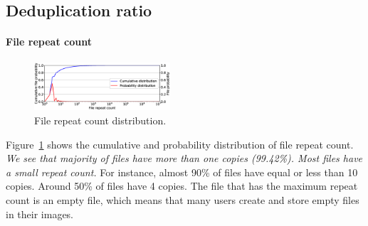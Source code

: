 \subsection{Deduplication ratio}
\label{sec:dedup_ratio}



\paragraph{File repeat count}
\begin{figure}
	\centering
	\includegraphics[width=0.45\textwidth]{graphs/File_repeat_count.eps}
	\caption{File repeat count distribution.
	}
	\label{fig:file-repeat-cnt}
\end{figure}

Figure~\ref{fig:file-repeat-cnt} shows the cumulative and probability
distribution of file repeat count.  \textit{We see that majority of files have
more than one copies (99.42\%).  Most files have a small repeat count.} For
instance, almost 90\% of files have equal or less than 10 copies. Around 50\%
of files have 4 copies.  The file that has the maximum repeat count is an empty
file, which means that many users create and store empty files in their
images.

